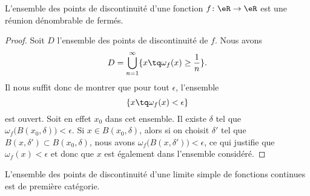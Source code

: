 \begin{lemma}       \label{LemuaPbtQ}
	L'ensemble des points de discontinuité d'une fonction \( f\colon \eR\to \eR\) est une réunion dénombrable de fermés.
\end{lemma}

\begin{proof}
	Soit \( D\) l'ensemble des points de discontinuité de \( f\). Nous avons
	\begin{equation}
		D=\bigcup_{n=1}^{\infty}\{ x\tq \omega_f(x)\geq \frac{1}{ n } \}.
	\end{equation}
	Il nous suffit donc de montrer que pour tout \( \epsilon\), l'ensemble
	\begin{equation}
		\{ x\tq \omega_f(x)<\epsilon \}
	\end{equation}
	est ouvert. Soit en effet \( x_0\) dans cet ensemble. Il existe \( \delta\) tel que \( \omega_f\big( B(x_0,\delta) \big)<\epsilon\). Si \( x\in B(x_0,\delta)\), alors si on choisit \( \delta'\) tel que \( B(x,\delta')\subset B(x_0,\delta)\), nous avons \( \omega_f\big( B(x,\delta') \big)<\epsilon\), ce qui justifie que \( \omega_f(x)<\epsilon\) et donc que \( x\) est également dans l'ensemble considéré.
\end{proof}

\begin{theorem}
	L'ensemble des points de discontinuité d'une limite simple de fonctions continues est de première catégorie.
\end{theorem}

